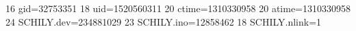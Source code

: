 16 gid=32753351
18 uid=1520560311
20 ctime=1310330958
20 atime=1310330958
24 SCHILY.dev=234881029
23 SCHILY.ino=12858462
18 SCHILY.nlink=1
